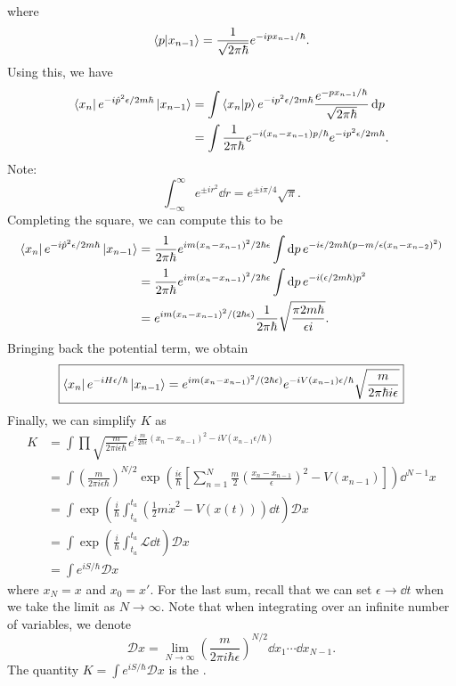 \documentclass{article}
\numberwithin{equation}{section}
\begin{document}
    where 
    \begin{equation}
        \bra{p}\ket{x_{n-1}} = \frac{1}{\sqrt{2\pi \hbar}}e^{-ipx_{n-1}/\hbar}.
    \end{equation}
    Using this, we have 
    \begin{align}
        \bra{x_n}e^{-i\hat{p}^2\epsilon/2m\hbar}\ket{x_{n-1}} &= \int \bra{x_n}\ket{p}e^{-ip^2\epsilon/2m\hbar} \frac{e^{-px_{n-1}/\hbar}}{\sqrt{2\pi\hbar}}\dd{p} \\ 
        &= \int \frac{1}{2\pi\hbar}e^{-i(x_n-x_{n-1})p/\hbar}e^{-ip^2\epsilon / 2m\hbar}.
    \end{align}
    Note:
    \begin{equation}
        \int_{-\infty}^{\infty} e^{\pm i r^2}\dd{r} = e^{\pm i\pi/4}\sqrt{\pi}.
    \end{equation}
    Completing the square, we can compute this to be 
    \begin{align}
        \bra{x_n}e^{-i\hat{p}^2\epsilon/2m\hbar}\ket{x_{n-1}} &= \frac{1}{2\pi \hbar}e^{im(x_n-x_{n-1})^2/2\hbar\epsilon}\int \dd{p} e^{-i\epsilon/2m\hbar (p-m/\epsilon (x_n-x_{n-2})^2)} \\ 
        &= \frac{1}{2\pi \hbar}e^{im(x_n-x_{n-1})^2/2\hbar\epsilon}\int \dd{p} e^{-i(\epsilon/2m\hbar) p^2} \\ 
        &= e^{im(x_n-x_{n-1})^2/(2\hbar\epsilon)}\frac{1}{2\pi \hbar}\sqrt{\frac{\pi 2m\hbar}{\epsilon i}}.
    \end{align}
    Bringing back the potential term, we obtain 
    \begin{equation}
        \boxed{\bra{x_n}e^{-iH\epsilon /\hbar}\ket{x_{n-1}} = e^{im(x_n-x_{n-1})^2/(2\hbar\epsilon)} e^{-iV(x_{n-1})\epsilon /\hbar}\sqrt{\frac{m}{2\pi \hbar i \epsilon}}}
    \end{equation}
    Finally, we can simplify $K$ as 
    \begin{align}
        K &= \int \prod \sqrt{\frac{m}{2\pi i\epsilon \hbar}}e^{i\frac{m}{2\hbar\epsilon}(x_n-x_{n-1})^2 - i V(x_{n-1}\epsilon/\hbar)} \\ 
        &= \int \left(\frac{m}{2\pi i \epsilon\hbar}\right)^{N/2} \exp\left(\frac{i\epsilon}{\hbar}\left[\sum_{n=1}^N \frac{m}{2}\left(\frac{x_n-x_{n-1}}{\epsilon}\right)^2 - V(x_{n-1})\right]\right) \dd^{N-1}x \\ 
        &= \int \exp\left(\frac{i}{\hbar} \int_{t_a}^{t_a}\left(\frac{1}{2}m\dot{x}^2 - V(x(t))\right)\dd{t}\right) \mathcal{D}x \\ 
        &= \int \exp\left(\frac{i}{\hbar} \int_{t_a}^{t_a}\mathcal{L}\dd{t}\right) \mathcal{D}x \\ 
        &= \int e^{iS/\hbar}\mathcal{D}x
    \end{align}
    where $x_N=x$ and $x_0=x'.$ For the last sum, recall that we can set $\epsilon \to \dd{t}$ when we take the limit as $N\to \infty.$ Note that when integrating over an infinite number of variables, we denote
    \begin{equation}
        \mathcal{D}x = \lim_{N\to \infty}\left(\frac{m}{2\pi i \hbar\epsilon}\right)^{N/2} \dd{x}_1\cdots \dd{x}_{N-1}.
    \end{equation}
    The quantity $K=\int e^{iS/\hbar}\mathcal{D}x$ is the .
\end{document}
